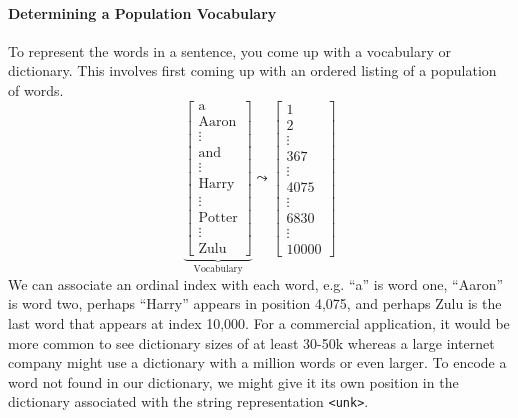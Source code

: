 \documentclass[12pt]{article}
\begin{document}
\paragraph{Determining a Population Vocabulary} To represent the words in a sentence, you come up with a vocabulary or dictionary. This involves first coming up with an ordered listing of a population of words.
\[
\underbrace{
\begin{bmatrix}
  \textrm{a} \\ \textrm{Aaron} \\ \vdots \\ \textrm{and} \\ \vdots \\ \textrm{Harry} \\ \vdots \\ \textrm{Potter} \\ \vdots \\ \textrm{Zulu}
\end{bmatrix}}_{\textrm{Vocabulary}} \leadsto \begin{bmatrix} 1 \\ 2 \\ \vdots \\ 367 \\ \vdots \\ 4075 \\ \vdots \\ 6830 \\ \vdots \\ 10000 \end{bmatrix}
\]
We can associate an ordinal index with each word, e.g. ``a'' is word one, ``Aaron'' is word two, perhaps ``Harry'' appears in position 4,075, and perhaps Zulu is the last word that appears at index 10,000. For a commercial application, it would be more common to see dictionary sizes of at least 30-50k whereas a large internet company might use a dictionary with a million words or even larger. To encode a word not found in our dictionary, we might give it its own position in the dictionary associated with the string representation \texttt{<unk>}.
\end{document}
